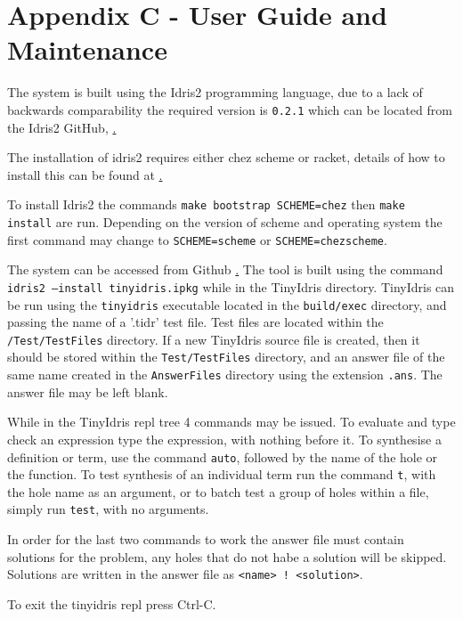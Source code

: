 \documentclass[a4paper]{article}
\begin{document}
\label{sec:org30d868f}
\clearpage

\section{Appendix C - User Guide and Maintenance}

The system is built using the Idris2 programming language, due to
a lack of backwards comparability the required version is
\texttt{0.2.1} which can be located from the Idris2 GitHub,
\href{https://github.com/idris-lang/Idris2/tree/compat-0.2.1}.

The installation of idris2 requires either chez scheme or racket,
details of how to install this can be found at
\href{https://www.scheme.com/}.

To install Idris2 the commands \texttt{make bootstrap SCHEME=chez}
then \texttt{make install} are run. Depending on the version of
scheme and operating system the first command may change to
\texttt{SCHEME=scheme} or \texttt{SCHEME=chezscheme}. 


The system can be accessed from Github \href{https://github.com/Ablach/tiny-idris-program-synthesis}. The tool is built using the command
\texttt{idris2 --install tinyidris.ipkg} while in the TinyIdris
directory. TinyIdris can be run using the \texttt{tinyidris}
executable located in the \texttt{build/exec} directory, and passing
the name of a '.tidr' test file. Test files are located within the \texttt{/Test/TestFiles} directory. If a new TinyIdris source file is created, then it
should be stored within the \texttt{Test/TestFiles}
directory, and an answer file of the same name created in the
\texttt{AnswerFiles} directory using the extension \texttt{.ans}.
The answer file may be left blank. 

While in the TinyIdris repl tree 4 commands may be issued. To evaluate
and type check an expression type the expression, with nothing before
it. To synthesise a definition or term, use the command \texttt{auto},
followed by the name of the hole or the function.
To test synthesis of an individual term run the command \texttt{t},
with the hole name as an argument, or to batch test a group of holes
within a file, simply run \texttt{test}, with no arguments.

In order for the last two commands to work the answer file must contain
solutions for the problem, any holes that do not habe a solution will
be skipped. Solutions are written in the answer file as
\texttt{<name> ! <solution>}.

To exit the tinyidris repl press Ctrl-C.
\end{document}
